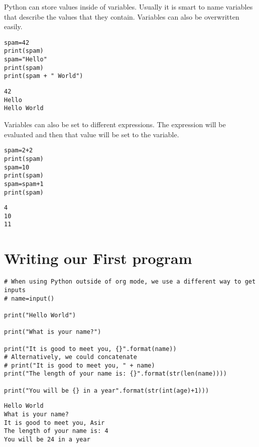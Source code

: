 \documentclass[11pt]{article}
\begin{document}
Python can store values inside of variables. Usually it is smart to name variables that describe the values that they contain. Variables can also be overwritten easily.

\begin{verbatim}
spam=42
print(spam)
spam="Hello"
print(spam)
print(spam + " World")
\end{verbatim}

\begin{verbatim}
42
Hello
Hello World
\end{verbatim}


Variables can also be set to different expressions. The expression will be evaluated and then that value will be set to the variable.

\begin{verbatim}
spam=2+2
print(spam)
spam=10
print(spam)
spam=spam+1
print(spam)
\end{verbatim}

\begin{verbatim}
4
10
11
\end{verbatim}

\section{Writing our First program}
\label{sec:org2f94eda}

\begin{verbatim}
# When using Python outside of org mode, we use a different way to get inputs
# name=input()

print("Hello World")

print("What is your name?")

print("It is good to meet you, {}".format(name))
# Alternatively, we could concatenate
# print("It is good to meet you, " + name)
print("The length of your name is: {}".format(str(len(name))))

print("You will be {} in a year".format(str(int(age)+1)))
\end{verbatim}

\begin{verbatim}
Hello World
What is your name?
It is good to meet you, Asir
The length of your name is: 4
You will be 24 in a year
\end{verbatim}
\end{document}
